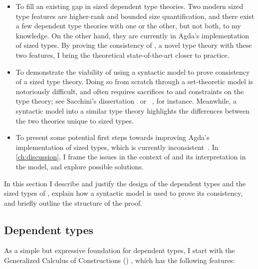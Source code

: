 \begin{itemize}
  \item To fill an existing gap in sized dependent type theories.
    Two modern sized type features are higher-rank and bounded size quantification,
    and there exist a few dependent type theories with one or the other,
    but not both, to my knowledge.
    On the other hand, they are currently in Agda's implementation of sized types.
    By proving the consistency of \lang, a novel type theory with these two features,
    I bring the theoretical state-of-the-art closer to practice.
  \item To demonstrate the viability of using a syntactic model to prove consistency
    of a sized type theory.
    Doing so from scratch through a set-theoretic model is notoriously difficult,
    and often requires sacrifices to and constraints on the type theory;
    see Sacchini's dissertation~\citep{CIC-hat-minus} or \CIChatstar~\citep{CIC-hat-star},
    for instance.
    Meanwhile, a syntactic model into a similar type theory
    highlights the differences between the two theories unique to sized types.
  \item To present some potential first steps towards improving Agda's implementation of sized types,
    which is currently inconsistent~\citep{infinity}.
    In \cref{ch:discussion}, I frame the issues in the context of \lang
    and its interpretation in the model,
    and explore possible solutions.
\end{itemize}

In this section I describe and justify the design of
the dependent types and the sized types of \lang,
explain how a syntactic model is used to prove its consistency,
and briefly outline the structure of the proof.

\subsection{Dependent types}

As a simple but expressive foundation for dependent types,
I start with the Generalized Calculus of Constructions (\GCC) \citep{GCC-Coquand},
which has the following features:

